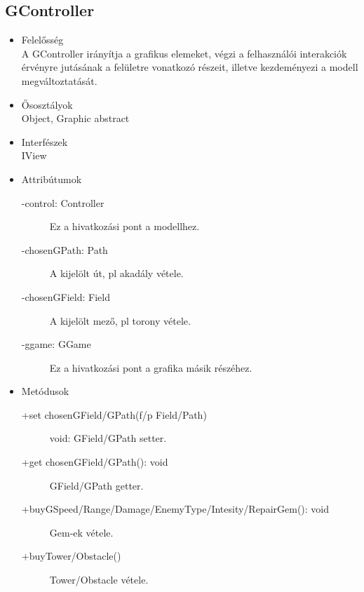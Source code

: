 \subsection{GController}
\begin{itemize}
\item Felelősség\\
A GController irányítja a grafikus elemeket, végzi a felhasználói interakciók érvényre jutásának a felületre vonatkozó részeit, illetve kezdeményezi a modell megváltoztatását.
\item Ősosztályok\\
Object, Graphic abstract
\item Interfészek\\
IView
\item Attribútumok\\
	\begin{description}
		\item[-control: Controller] Ez a hivatkozási pont a modellhez.
		\item[-chosenGPath: Path] A kijelölt út, pl akadály vétele.
		\item[-chosenGField: Field] A kijelölt mező, pl torony vétele.
		\item[-ggame: GGame] Ez a hivatkozási pont a grafika másik részéhez.
\end{description}
\item Metódusok\\
	\begin{description}
		\item[+set chosenGField/GPath(f/p Field/Path)] void: GField/GPath setter.
		\item[+get chosenGField/GPath(): void] GField/GPath getter.
		\item[+buyGSpeed/Range/Damage/EnemyType/Intesity/RepairGem(): void] Gem-ek vétele.
		\item[+buyTower/Obstacle()] Tower/Obstacle vétele.
	\end{description}
\end{itemize}

